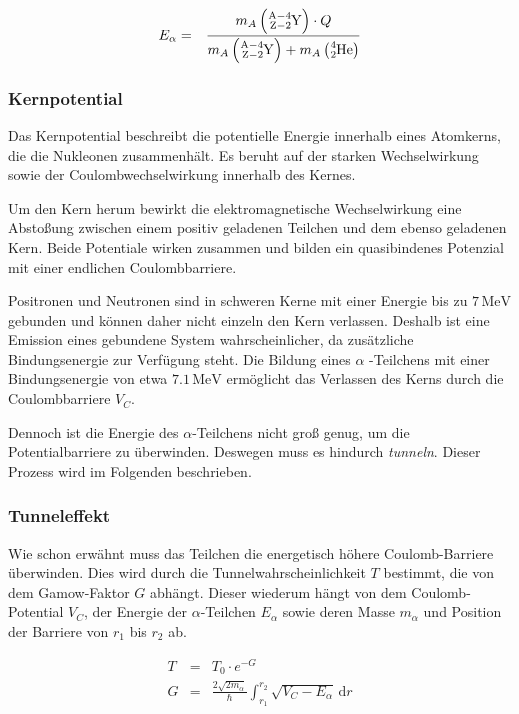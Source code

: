 \documentclass[12pt,a4paper]{scrartcl}
\numberwithin{equation}{section} %
\begin{document}
\begin{eqnarray}
    E_\alpha
        &=& \frac{m_{A}\left(\ce{^{A-4}_{Z-2}Y}\right) \cdot Q}
            {m_{A}\left(\ce{^{A-4}_{Z-2}Y}\right)+m_{A}\left(\ce{^4_2He}\right)}
\end{eqnarray}

\hypertarget{kernpotential}{%
\subsubsection{Kernpotential}\label{kernpotential}}

Das Kernpotential beschreibt die potentielle Energie innerhalb eines Atomkerns, die die Nukleonen zusammenhält. Es beruht auf der starken Wechselwirkung sowie der Coulombwechselwirkung innerhalb des Kernes.

Um den Kern herum bewirkt die elektromagnetische Wechselwirkung eine Abstoßung zwischen einem positiv geladenen Teilchen und dem ebenso geladenen Kern. Beide Potentiale wirken zusammen und bilden ein quasibindenes Potenzial mit einer endlichen Coulombbarriere.

Positronen und Neutronen sind in schweren Kerne mit einer Energie bis zu $7\mathrm{\,MeV}$ gebunden und können daher nicht einzeln den Kern verlassen. Deshalb ist eine Emission eines gebundene System wahrscheinlicher, da zusätzliche Bindungsenergie zur Verfügung steht. Die Bildung eines $\alpha$ -Teilchens mit einer Bindungsenergie von etwa $7.1\mathrm{\,MeV}$ ermöglicht das Verlassen des Kerns durch die Coulombbarriere $V_C$.

Dennoch ist die Energie des $\alpha$-Teilchens nicht groß genug, um die Potentialbarriere zu überwinden. Deswegen muss es hindurch \emph{tunneln}. Dieser Prozess wird im Folgenden beschrieben.

\hypertarget{tunneleffekt}{%
\subsubsection{Tunneleffekt}\label{tunneleffekt}}

Wie schon erwähnt muss das Teilchen die energetisch höhere Coulomb-Barriere überwinden. Dies wird durch die Tunnelwahrscheinlichkeit $T$ bestimmt, die von dem Gamow-Faktor $G$ abhängt. Dieser wiederum hängt von dem Coulomb-Potential $V_C$, der Energie der $\alpha$-Teilchen $E_\alpha$ sowie deren Masse $m_\alpha$ und Position der Barriere von $r_1$ bis $r_2$ ab. \cite{Demtröder}

\begin{eqnarray}
    T &=& T_0 \cdot e^{-G} \\
    G &=&
        \frac{2\sqrt{2m_\alpha}}{\hbar}
        \int_{r_{1}}^{r_{2}}\sqrt{V_{C}-E_{\alpha}}
        \,\mathrm dr
\end{eqnarray}
\end{document}
